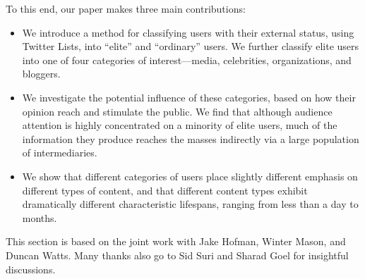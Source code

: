 \documentclass[phd,tocprelim]{cornell}
\begin{document}
To this end, our paper makes three main contributions:
\begin{itemize}
\item We introduce a method for classifying users with their external status, using Twitter
  Lists, into ``elite'' and ``ordinary'' users. We further classify elite users into one of four categories of interest---media,
  celebrities, organizations, and bloggers.
\item We investigate the potential influence of these categories, based on how their opinion reach and stimulate the public. We find that although audience attention is highly concentrated on a
  minority of elite users, much of the information they produce
  reaches the masses indirectly via a large population of
  intermediaries. %
\item We show that different categories of users place slightly
  different emphasis on different types of content, and that different
  content types exhibit dramatically different characteristic
  lifespans, ranging from less than a day to months.
\end{itemize}

This section is based on the joint work\cite{Wu-Twitter-2011} with Jake Hofman, Winter Mason, and Duncan Watts. Many thanks also go to Sid Suri and Sharad Goel for insightful discussions.




\end{document}
